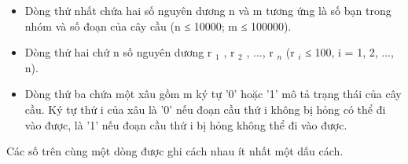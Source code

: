 \begin{itemize}
	\item Dòng thứ nhất chứa hai số nguyên dương n và m tương ứng là số bạn trong nhóm và số đoạn của cây cầu (n ≤ 10000; m ≤ 100000).
	\item Dòng thứ hai chứ n số nguyên dương r $_ 1 $ , r $_ 2 $ , ..., r $_ n $ (r $_ i $ ≤ 100, i = 1, 2, ..., n).
	\item Dòng thứ ba chứa một xâu gồm m ký tự '0' hoặc '1' mô tả trạng thái của cây cầu. Ký tự thứ i của xâu là '0' nếu đoạn cầu thứ i không bị hỏng có thể đi vào được, là '1' nếu đoạn cầu thứ i bị hỏng không thể đi vào được.
\end{itemize}

Các số trên cùng một dòng được ghi cách nhau ít nhất một dấu cách.

\